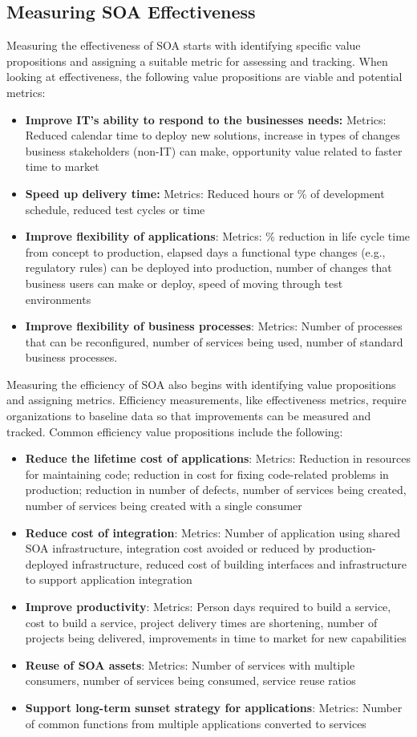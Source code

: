\documentclass[12pt,a4paper,final,twoside,onecolumn,titlepage]{book}
\begin{document}
\subsection{Measuring SOA Effectiveness}
Measuring the effectiveness of \gls{SOA} starts with identifying specific value propositions and assigning a suitable metric for assessing and tracking. When looking at effectiveness, the following value propositions are viable and potential metrics:
\begin{itemize}
\item \textbf{Improve IT’s ability to respond to the businesses needs:} Metrics: Reduced calendar time to deploy new solutions, increase in types of changes business stakeholders (non-IT) can make, opportunity value related to faster time to market
\item \textbf{Speed up delivery time:} Metrics: Reduced hours or \% of development schedule, reduced test cycles or time
\item \textbf{Improve flexibility of applications}: Metrics: \% reduction in life cycle time from concept to production, elapsed days a functional type changes (e.g., regulatory rules) can be deployed into production, number of changes that business users can make or deploy, speed of moving through test environments
\item \textbf{Improve flexibility of business processes}: Metrics: Number of processes that can be reconfigured, number of services being used, number of standard business processes.
\end{itemize}
Measuring the efficiency of \gls{SOA} also begins with identifying value propositions and assigning metrics. Efficiency measurements, like effectiveness metrics, require organizations to baseline data so that improvements can be measured and tracked. Common efficiency value propositions include the following:
\begin{itemize}
\item \textbf{Reduce the lifetime cost of applications}: Metrics: Reduction in resources for maintaining code; reduction in cost for fixing code-related problems in production; reduction in number of defects, number of services being created, number of services being created with a single consumer
\item \textbf{Reduce cost of integration}: Metrics: Number of application using shared \gls{SOA} infrastructure, integration cost avoided or reduced by production- deployed infrastructure, reduced cost of building interfaces and infrastructure to support application integration
\item \textbf{Improve productivity}: Metrics: Person days required to build a service, cost to build a service, project delivery times are shortening, number of projects being delivered, improvements in time to market for new capabilities
\item \textbf{Reuse of \gls{SOA} assets}: Metrics: Number of services with multiple consumers, number of services being consumed, service reuse ratios
\item \textbf{Support long-term sunset strategy for applications}: Metrics: Number of common functions from multiple applications converted to services
\end{itemize}
\end{document}
